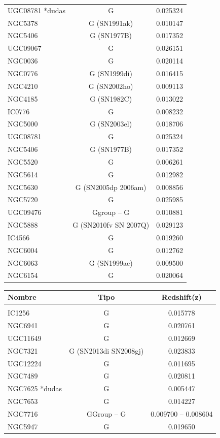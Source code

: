 \documentclass[9pt]{revtex4-1}
\begin{document}
\begin{@twocolumnfalse}
\begin{center}
\begin{tabular}{ l c c }
 UGC08781 *dudas & G & 0.025324 \\ %
 NGC5378 & G (SN1991ak) & 0.010147 \\ %
 NGC5406 & G (SN1977B) & 0.017352 \\ %
 UGC09067 & G & 0.026151 \\ %
 NGC0036 & G & 0.020114 \\ %
 NGC0776 & G (SN1999di) & 0.016415 \\ %
 NGC4210 & G (SN2002ho) & 0.009113 \\ %
 NGC4185 & G (SN1982C)  & 0.013022 \\ %
 IC0776  & G & 0.008232 \\ %
 NGC5000 & G (SN2003el) & 0.018706 \\ %
 UGC08781 & G & 0.025324 \\ %
 NGC5406 & G (SN1977B) & 0.017352 \\ %
 NGC5520 & G & 0.006261 \\ %
 NGC5614 & G & 0.012982 \\ %
 NGC5630 & G (SN2005dp 2006am) & 0.008856 \\ %
 NGC5720 & G & 0.025985 \\ %
 UGC09476 & Ggroup -- G & 0.010881 \\ %
 NGC5888 & G (SN2010fv SN 2007Q) & 0.029123 \\ %
 IC4566 & G & 0.019260 \\ %
 NGC6004 & G & 0.012762 \\ %
 NGC6063 & G (SN1999ac) & 0.009500 \\ %
 NGC6154 & G & 0.020064 \\ %
 
 \end{tabular}
 \end{center}
 
 \begin{center}
 \begin{tabular}{ l c c }
 Nombre & Tipo & Redshift(z)\\
 \hline 
 \hline \\
 
 IC1256 & G & 0.015778 \\ %
 NGC6941 & G & 0.020761 \\ %
 UGC11649 & G & 0.012669 \\ %
 NGC7321 & G (SN2013di SN2008gj) & 0.023833 \\ %
 UGC12224 & G & 0.011695 \\ %
 NGC7489 & G & 0.020811 \\ %
 NGC7625 *dudas & G & 0.005447 \\ %
 NGC7653 & G & 0.014227 \\ %
 NGC7716 & GGroup -- G & 0.009700 -- 0.008604 \\ %
 NGC5947 & G & 0.019650 \\  %
 

\end{tabular}
\end{center}
\end{@twocolumnfalse}
\end{document}
